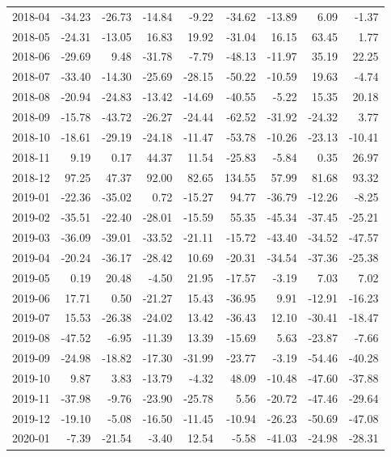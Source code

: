 \begin{table}[ht]
\begin{tabular}{lrrrrrrrr}
  2018-04 & -34.23 & -26.73 & -14.84 & -9.22 & -34.62 & -13.89 & 6.09 & -1.37 \\ 
  2018-05 & -24.31 & -13.05 & 16.83 & 19.92 & -31.04 & 16.15 & 63.45 & 1.77 \\ 
  2018-06 & -29.69 & 9.48 & -31.78 & -7.79 & -48.13 & -11.97 & 35.19 & 22.25 \\ 
  2018-07 & -33.40 & -14.30 & -25.69 & -28.15 & -50.22 & -10.59 & 19.63 & -4.74 \\ 
  2018-08 & -20.94 & -24.83 & -13.42 & -14.69 & -40.55 & -5.22 & 15.35 & 20.18 \\ 
  2018-09 & -15.78 & -43.72 & -26.27 & -24.44 & -62.52 & -31.92 & -24.32 & 3.77 \\ 
  2018-10 & -18.61 & -29.19 & -24.18 & -11.47 & -53.78 & -10.26 & -23.13 & -10.41 \\ 
  2018-11 & 9.19 & 0.17 & 44.37 & 11.54 & -25.83 & -5.84 & 0.35 & 26.97 \\ 
  2018-12 & 97.25 & 47.37 & 92.00 & 82.65 & 134.55 & 57.99 & 81.68 & 93.32 \\ 
  2019-01 & -22.36 & -35.02 & 0.72 & -15.27 & 94.77 & -36.79 & -12.26 & -8.25 \\ 
  2019-02 & -35.51 & -22.40 & -28.01 & -15.59 & 55.35 & -45.34 & -37.45 & -25.21 \\ 
  2019-03 & -36.09 & -39.01 & -33.52 & -21.11 & -15.72 & -43.40 & -34.52 & -47.57 \\ 
  2019-04 & -20.24 & -36.17 & -28.42 & 10.69 & -20.31 & -34.54 & -37.36 & -25.38 \\ 
  2019-05 & 0.19 & 20.48 & -4.50 & 21.95 & -17.57 & -3.19 & 7.03 & 7.02 \\ 
  2019-06 & 17.71 & 0.50 & -21.27 & 15.43 & -36.95 & 9.91 & -12.91 & -16.23 \\ 
  2019-07 & 15.53 & -26.38 & -24.02 & 13.42 & -36.43 & 12.10 & -30.41 & -18.47 \\ 
  2019-08 & -47.52 & -6.95 & -11.39 & 13.39 & -15.69 & 5.63 & -23.87 & -7.66 \\ 
  2019-09 & -24.98 & -18.82 & -17.30 & -31.99 & -23.77 & -3.19 & -54.46 & -40.28 \\ 
  2019-10 & 9.87 & 3.83 & -13.79 & -4.32 & 48.09 & -10.48 & -47.60 & -37.88 \\ 
  2019-11 & -37.98 & -9.76 & -23.90 & -25.78 & 5.56 & -20.72 & -47.46 & -29.64 \\ 
  2019-12 & -19.10 & -5.08 & -16.50 & -11.45 & -10.94 & -26.23 & -50.69 & -47.08 \\ 
  2020-01 & -7.39 & -21.54 & -3.40 & 12.54 & -5.58 & -41.03 & -24.98 & -28.31 \\ 

\end{tabular}
\end{table}
